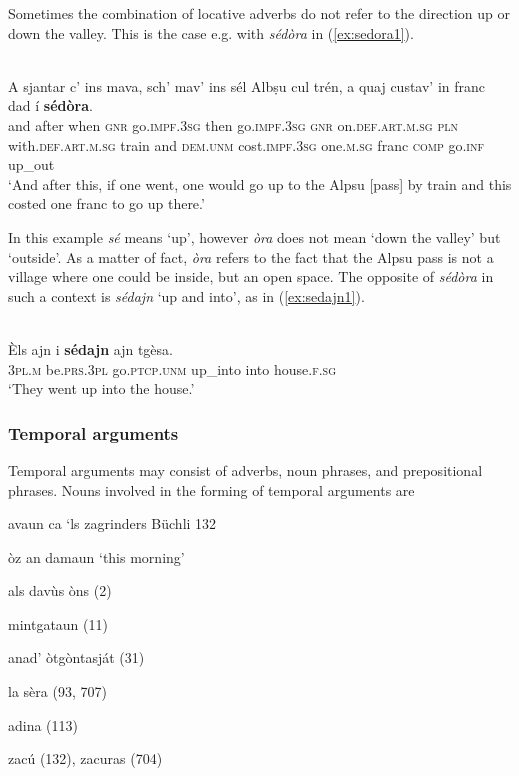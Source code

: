 Sometimes the combination of locative adverbs do not refer to the direction up or down the valley. This is the case e.g. with \textit{sédòra} in (\ref{ex:sedora1}).

\ea
\label{ex:sedora1}
\\
\gll    A sjantar c’ ins mava, sch’ mav’ ins sél Albṣu cul trén, a quaj custav’ in franc dad í \textbf{sédòra}.\\
and after when \textsc{gnr}  go.\textsc{impf.3sg} then go.\textsc{impf.3sg} \textsc{gnr} on.\textsc{def.art.m.sg} \textsc{pln} with.\textsc{def.art.m.sg} train and \textsc{dem.unm} cost.\textsc{impf.3sg} one.\textsc{m.sg}  franc \textsc{comp} go.\textsc{inf} up\_out \\
\glt `And after this, if one went, one would go up to the Alpsu [pass] by train and this costed one franc to go up there.'
\z

In this example \textit{sé} means `up', however \textit{òra} does not mean `down the valley' but `outside'. As a matter of fact, \textit{òra} refers to the fact that the Alpsu pass is not a village where one could be inside, but an open space. The opposite of \textit{sédòra} in such a context is \textit{sédajn} `up and into', as in (\ref{ex:sedajn1}).

\ea
\label{ex:sedajn1}
\\
\gll Èls ajn i \textbf{sédajn} ajn tgèsa.\\
\textsc{3pl.m} be.\textsc{prs.3pl} go.\textsc{ptcp.unm} up\_into into house.\textsc{f.sg}\\
\glt `They went up into the house.'
\z

\subsubsection{Temporal arguments}
Temporal arguments may consist of adverbs, noun phrases, and prepositional phrases. Nouns involved in the forming of temporal arguments are

avaun ca `ls zagrinders Büchli 132

òz an damaun `this morning'

als davùs òns (2)

mintgataun (11)

anad' òtgòntasját (31)

la sèra (93, 707)

adina (113)

zacú (132), zacuras (704)


